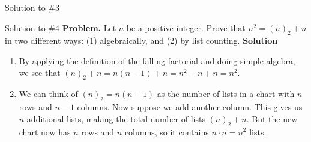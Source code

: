 \documentclass[dvipsnames, 10pt]{beamer}
\begin{document}
\begin{frame}{Solution to \#3}
\end{frame}


\begin{frame}{Solution to \#4}
\textbf{Problem.} Let $n$ be a positive integer. Prove that $n^2 = (n)_2 + n$ in two different ways: (1) algebraically, and (2) by list counting.
\vfill 
\textbf{Solution}
\begin{enumerate}
	\item By applying the definition of the falling factorial and doing simple algebra, we see that $(n)_2 +n = n(n-1) +n = n^2 - n + n = n^2$.
	\item We can think of $(n)_2 = n(n-1)$ as the number of lists in a chart with $n$ rows and $n-1$ columns.  Now suppose we add another column.  This gives us $n$ additional lists, making the total number of lists $(n)_2 + n$. But the new chart now has $n$ rows and $n$ columns, so it contains $n \cdot n =n^2$ lists.
\end{enumerate}
\end{frame}
\end{document}
